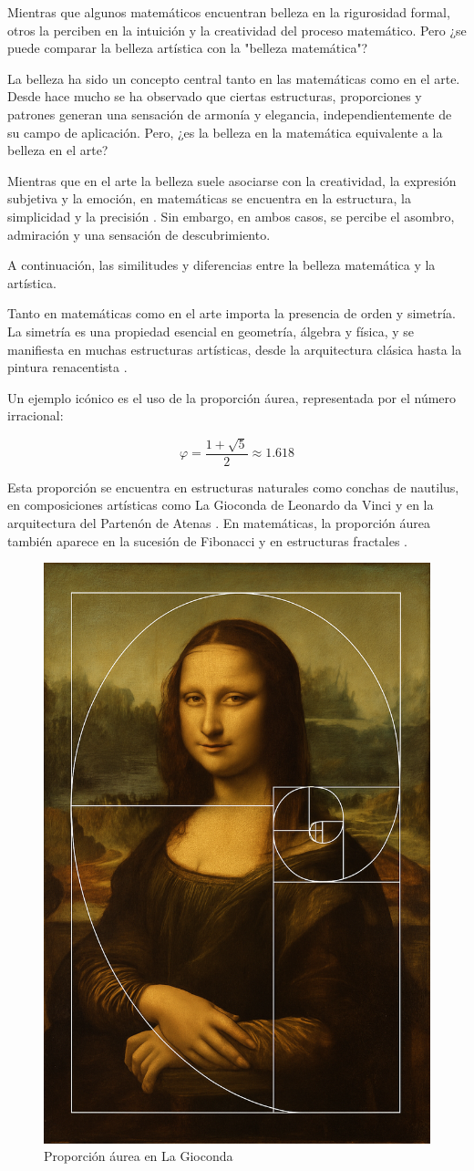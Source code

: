 \documentclass[twocolumn]{article}
\begin{document}
Mientras que algunos matemáticos encuentran belleza en la rigurosidad formal, otros la perciben en la intuición y la creatividad del proceso matemático. Pero ¿se puede comparar la belleza artística con la "belleza matemática"?

La belleza ha sido un concepto central tanto en las matemáticas como en el arte. Desde hace mucho se ha observado que ciertas estructuras, proporciones y patrones generan una sensación de armonía y elegancia, independientemente de su campo de aplicación. Pero, ¿es la belleza en la matemática equivalente a la belleza en el arte?

 Mientras que en el arte la belleza suele asociarse con la creatividad, la expresión subjetiva y la emoción, en matemáticas se encuentra en la estructura, la simplicidad y la precisión \cite{livio2017}. Sin embargo, en ambos casos, se percibe el asombro, admiración y una sensación de descubrimiento.

A continuación, las similitudes y diferencias entre la belleza matemática y la artística.

Tanto en matemáticas como en el arte importa la presencia de orden y simetría. La simetría es una propiedad esencial en geometría, álgebra y física, y se manifiesta en muchas estructuras artísticas, desde la arquitectura clásica hasta la pintura renacentista \cite{weyl1952}. 

Un ejemplo icónico es el uso de la \textit{}{proporción áurea}, representada por el número irracional:

\begin{equation}
    \varphi = \frac{1 + \sqrt{5}}{2} \approx 1.618
\end{equation}

Esta proporción se encuentra en estructuras naturales como conchas de nautilus, en composiciones artísticas como La Gioconda de Leonardo da Vinci y en la arquitectura del Partenón de Atenas \cite{livio2002}. En matemáticas, la proporción áurea también aparece en la sucesión de Fibonacci y en estructuras fractales \cite{livio2017}.


\begin{figure} [h]
    \centering
    \includegraphics[width=0.5\linewidth]{imagen5.png}
    \caption{Proporción áurea en La Gioconda}
    \label{fig:enter-label}
\end{figure}
\end{document}
